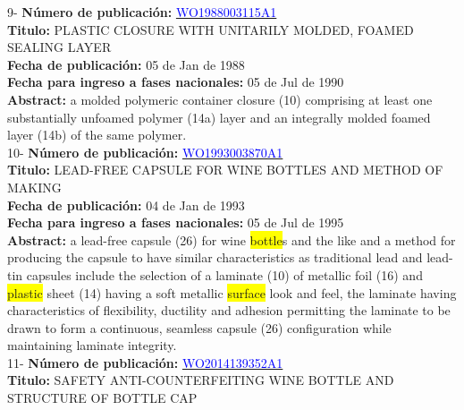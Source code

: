  \vspace{1cm}9- \textbf{Número de publicación:} \href{https://worldwide.espacenet.com/publicationDetails/biblio?DB=EPODOC&II=0&ND=3&adjacent=true&locale=en_EP&FT=D&date=20160331&CC=WO&NR=1988003115A1&KC=A1#}{\textcolor{blue}{WO1988003115A1}}\\ 
\textbf{Titulo:} PLASTIC CLOSURE WITH UNITARILY MOLDED, FOAMED SEALING LAYER\\ 
 
\textbf{Fecha de publicación:} 05 de Jan de 1988\\ 
\textbf{Fecha para ingreso a fases nacionales:} 05 de Jul de 1990\\ 
\textbf{Abstract:} a molded polymeric container closure (10) comprising at least one substantially unfoamed polymer (14a) layer and an integrally molded foamed layer (14b) of the same polymer.\\ 
 

 \vspace{1cm}10- \textbf{Número de publicación:} \href{https://worldwide.espacenet.com/publicationDetails/biblio?DB=EPODOC&II=0&ND=3&adjacent=true&locale=en_EP&FT=D&date=20160331&CC=WO&NR=1993003870A1&KC=A1#}{\textcolor{blue}{WO1993003870A1}}\\ 
\textbf{Titulo:} LEAD-FREE CAPSULE FOR WINE BOTTLES AND METHOD OF MAKING\\ 
 
\textbf{Fecha de publicación:} 04 de Jan de 1993\\ 
\textbf{Fecha para ingreso a fases nacionales:} 05 de Jul de 1995\\ 
\textbf{Abstract:} a lead-free capsule (26) for wine \colorbox{yellow}{bottle}s and the like and a method for producing the capsule to have similar characteristics as traditional lead and lead-tin capsules include the selection of a laminate (10) of metallic foil (16) and \colorbox{yellow}{plastic} sheet (14) having a soft metallic \colorbox{yellow}{surface} look and feel, the laminate having characteristics of flexibility, ductility and adhesion permitting the laminate to be drawn to form a continuous, seamless capsule (26) configuration while maintaining laminate integrity.\\ 
 

 \vspace{1cm}11- \textbf{Número de publicación:} \href{https://worldwide.espacenet.com/publicationDetails/biblio?DB=EPODOC&II=0&ND=3&adjacent=true&locale=en_EP&FT=D&date=20160331&CC=WO&NR=2014139352A1&KC=A1#}{\textcolor{blue}{WO2014139352A1}}\\ 
\textbf{Titulo:} SAFETY ANTI-COUNTERFEITING WINE BOTTLE AND STRUCTURE OF BOTTLE CAP\\ 
 
